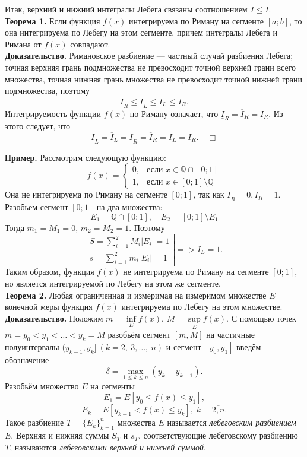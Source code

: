 \documentclass[12pt,a4paper, titlepage]{article}
\begin{document}
Итак, верхний и нижний интегралы Лебега связаны соотношением $\underline{I} \leqslant \overline{I}$.\\

\textbf{Теорема 1.} Если функция $f(x)$ интегрируема по Риману на сегменте $[a; b]$, то она интегрируема по Лебегу на этом сегменте, причем интегралы Лебега и Римана от $f(x)$ совпадают.\\
\textbf{Доказательство.} Римановское разбиение --- частный случай разбиения Лебега; точная верхняя грань подмножества не превосходит точной верхней грани всего множества, точная нижняя грань множества не превосходит точной нижней грани подмножества, поэтому 
$$
\underline{I }_R \leqslant \underline{I}_L \leqslant \overline{I}_L \leqslant \overline{I}_R.
$$
Интегрируемость функции $f(x)$ по Риману означает, что $\underline{I}_R = \overline{I}_R = I_R$. Из этого следует, что
$$
\underline{I}_L = \overline{I}_L = \underline{I}_R = \overline{I}_R = I_L = I_R. \quad \Box
$$

\textbf{Пример.} Рассмотрим следующую функцию:
$$
f(x)=\begin{cases}
0,&\text{если $x \in \mathbb{Q} \cap [0; 1]$}\\
1,&\text{если $x \in [0; 1] \setminus \mathbb{Q}$}
\end{cases}
$$
Она не интегрируема по Риману на сегменте $[0; 1]$, так как $\underline{I}_R = 0, \overline{I}_R = 1$. Разобьем сегмент $[0; 1]$ на два множества:
$$
E_1 = \mathbb{Q} \cap [0; 1], \quad E_2 = [0; 1] \setminus E_1
$$
Тогда $m_1 = M_1 = 0$, $m_2 = M_2 = 1$. Поэтому
$$
\left.
\begin{matrix}
S = \sum_{i=1}^2 M_i |E_i| = 1 \\
s = \sum_{i=1}^2 m_i |E_i| = 1
\end{matrix}
\right|
=>
I_L = 1.
$$
Таким образом, функция $f(x)$ не интегрируема по Риману на сегменте $[0; 1]$, но является интегрируемой по Лебегу на этом же сегменте.\\

\textbf{Теорема 2.} Любая ограниченная и измеримая на измеримом множестве $E$ конечной меры функция $f(x)$ интегрируема по Лебегу на этом множестве.\\
\textbf{Доказательство.} Положим $m = \inf\limits_E f(x)$, $M = \sup\limits_E f(x)$. С помощью точек $m = y_0 < y_1 < \dots < y_k = M$ разобьём сегмент $[m, M]$ на частичные полуинтервалы $(y_{k-1}, y_k] \ (k = 2,\ 3,\dots,\ n)$ и сегмент $[y_0, y_1]$ введём обозначение 
$$
\delta = \max_{1 \leqslant k \leqslant n} (y_k - y_{k-1}).
$$
Разобьём множество $E$ на сегменты
$$
E_1 = E[y_0 \leqslant f(x) \leqslant y_1],
$$
$$
E_k = E[y_{k-1} < f(x) \leqslant y_k], \; k = \overline{2,n}.
$$
Такое разбиение $T = \lbrace E_k \rbrace_{k=1}^n$ множества $E$ называется \textit{лебеговским разбиением} $E$. Верхняя и нижняя суммы $S_T$ и $s_T$, соответствующие лебеговскому разбиению $T$, называются \textit{лебеговскими верхней и нижней суммой}.\\
\end{document}
